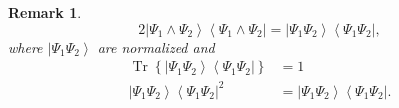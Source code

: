 \documentclass[aps,preprint]{revtex4}%
\newtheorem{remark}[theorem]{Remark}
\begin{document}
\begin{remark}%
\begin{equation}
2\left\vert \Psi_{1}\wedge\Psi_{2}\right\rangle \left\langle \Psi_{1}%
\wedge\Psi_{2}\right\vert =\left\vert \Psi_{1}\Psi_{2}\right\rangle
\left\langle \Psi_{1}\Psi_{2}\right\vert ,
\end{equation}
where $\left\vert \Psi_{1}\Psi_{2}\right\rangle $ are normalized and
\begin{align}
\operatorname{Tr}\left\{  \left\vert \Psi_{1}\Psi_{2}\right\rangle
\left\langle \Psi_{1}\Psi_{2}\right\vert \right\}   &  =1\\
\left\vert \Psi_{1}\Psi_{2}\right\rangle \left\langle \Psi_{1}\Psi
_{2}\right\vert ^{2}  &  =\left\vert \Psi_{1}\Psi_{2}\right\rangle
\left\langle \Psi_{1}\Psi_{2}\right\vert .
\end{align}

\end{remark}
\end{document}
